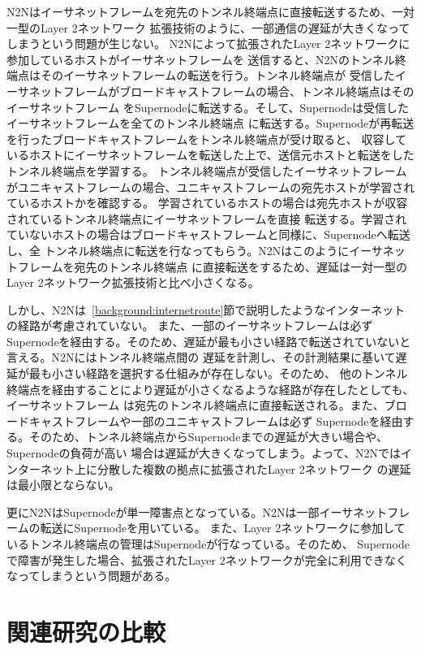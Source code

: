 N2Nはイーサネットフレームを宛先のトンネル終端点に直接転送するため、一対一型のLayer 2ネットワーク
拡張技術のように、一部通信の遅延が大きくなってしまうという問題が生じない。
N2Nによって拡張されたLayer 2ネットワークに参加しているホストがイーサネットフレームを
送信すると、N2Nのトンネル終端点はそのイーサネットフレームの転送を行う。トンネル終端点が
受信したイーサネットフレームがブロードキャストフレームの場合、トンネル終端点はそのイーサネットフレーム
をSupernodeに転送する。そして、Supernodeは受信したイーサネットフレームを全てのトンネル終端点
に転送する。Supernodeが再転送を行ったブロードキャストフレームをトンネル終端点が受け取ると、
収容しているホストにイーサネットフレームを転送した上で、送信元ホストと転送をしたトンネル終端点を学習する。
トンネル終端点が受信したイーサネットフレーム
がユニキャストフレームの場合、ユニキャストフレームの宛先ホストが学習されているホストかを確認する。
学習されているホストの場合は宛先ホストが収容されているトンネル終端点にイーサネットフレームを直接
転送する。学習されていないホストの場合はブロードキャストフレームと同様に、Supernodeへ転送し、全
トンネル終端点に転送を行なってもらう。N2Nはこのようにイーサネットフレームを宛先のトンネル終端点
に直接転送をするため、遅延は一対一型のLayer 2ネットワーク拡張技術と比べ小さくなる。

しかし、N2Nは~\ref{background:internetroute}節で説明したようなインターネットの経路が考慮されていない。
また、一部のイーサネットフレームは必ずSupernodeを経由する。そのため、遅延が最も小さい経路で転送されていないと言える。N2Nにはトンネル終端点間の
遅延を計測し、その計測結果に基いて遅延が最も小さい経路を選択する仕組みが存在しない。そのため、
他のトンネル終端点を経由することにより遅延が小さくなるような経路が存在したとしても、イーサネットフレーム
は宛先のトンネル終端点に直接転送される。また、ブロードキャストフレームや一部のユニキャストフレームは必ず
Supernodeを経由する。そのため、トンネル終端点からSupernodeまでの遅延が大きい場合や、Supernodeの負荷が高い
場合は遅延が大きくなってしまう。よって、N2Nではインターネット上に分散した複数の拠点に拡張されたLayer 2ネットワーク
の遅延は最小限とならない。

更にN2NはSupernodeが単一障害点となっている。N2Nは一部イーサネットフレームの転送にSupernodeを用いている。
また、Layer 2ネットワークに参加しているトンネル終端点の管理はSupernodeが行なっている。そのため、
Supernodeで障害が発生した場合、拡張されたLayer 2ネットワークが完全に利用できなくなってしまうという問題がある。

\section{関連研究の比較}
\label{background:korekara}

